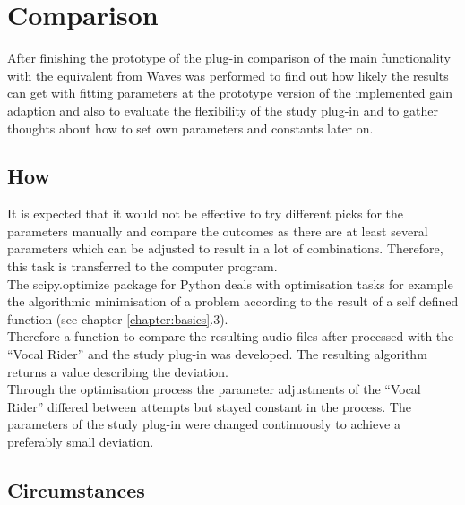 \chapter{Comparison}
\label{chapter:comparison}

After finishing the prototype of the plug-in comparison of the main functionality with the equivalent from Waves was performed to find out how likely the results can get with fitting parameters at the prototype version of the implemented gain adaption and also to evaluate the flexibility of the study plug-in and to gather thoughts about how to set own parameters and constants later on.\\

\section{How}

It is expected that it would not be effective to try different picks for the parameters manually and compare the outcomes as there are at least several parameters which can be adjusted to result in a lot of combinations. Therefore, this task is transferred to the computer program.\\
The scipy.optimize package for Python deals with optimisation tasks for example the algorithmic minimisation of a problem according to the result of a self defined function (see chapter \ref{chapter:basics}.3).\\
Therefore a function to compare the resulting audio files after processed with the “Vocal Rider” and the study plug-in was developed. The resulting algorithm returns a value describing the deviation.\\
Through the optimisation process the parameter adjustments of the “Vocal Rider” differed between attempts but stayed constant in the process. The parameters of the study plug-in were changed continuously to achieve a preferably small deviation.\\

\section{Circumstances}

